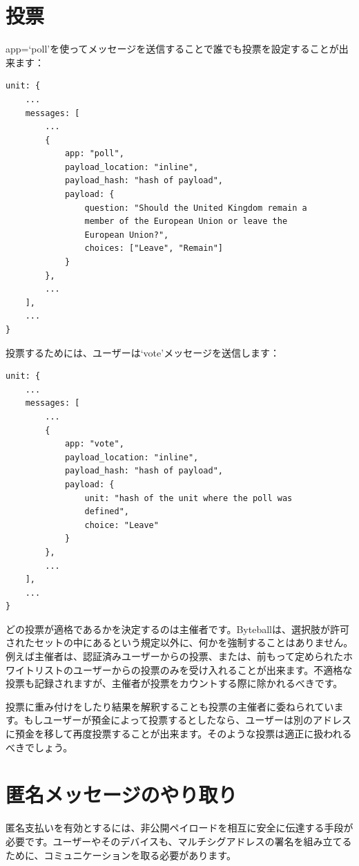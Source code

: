 \documentclass[a4paper, dvipdfmx]{jsarticle}
\begin{document}
\section{投票}

app=`poll'を使ってメッセージを送信することで誰でも投票を設定することが出来ます：

\begin{lstlisting}[basicstyle=\ttfamily\footnotesize, frame=none]
unit: {
    ...
    messages: [
        ...
        {
            app: "poll",
            payload_location: "inline",
            payload_hash: "hash of payload",
            payload: {
                question: "Should the United Kingdom remain a
                member of the European Union or leave the
                European Union?",
                choices: ["Leave", "Remain"]
            }
        },
        ...
    ],
    ...
}
\end{lstlisting}

投票するためには、ユーザーは`vote'メッセージを送信します：

\begin{lstlisting}[basicstyle=\ttfamily\footnotesize, frame=none]
unit: {
    ...
    messages: [
        ...
        {
            app: "vote",
            payload_location: "inline",
            payload_hash: "hash of payload",
            payload: {
                unit: "hash of the unit where the poll was
                defined",
                choice: "Leave"
            }
        },
        ...
    ],
    ...
}
\end{lstlisting}

どの投票が適格であるかを決定するのは主催者です。Byteballは、選択肢が許可されたセットの中にあるという規定以外に、何かを強制することはありません。例えば主催者は、認証済みユーザーからの投票、または、前もって定められたホワイトリストのユーザーからの投票のみを受け入れることが出来ます。不適格な投票も記録されますが、主催者が投票をカウントする際に除かれるべきです。

投票に重み付けをしたり結果を解釈することも投票の主催者に委ねられています。もしユーザーが預金によって投票するとしたなら、ユーザーは別のアドレスに預金を移して再度投票することが出来ます。そのような投票は適正に扱われるべきでしょう。


\section{匿名メッセージのやり取り}

匿名支払いを有効とするには、非公開ペイロードを相互に安全に伝達する手段が必要です。ユーザーやそのデバイスも、マルチシグアドレスの署名を組み立てるために、コミュニケーションを取る必要があります。
\end{document}
